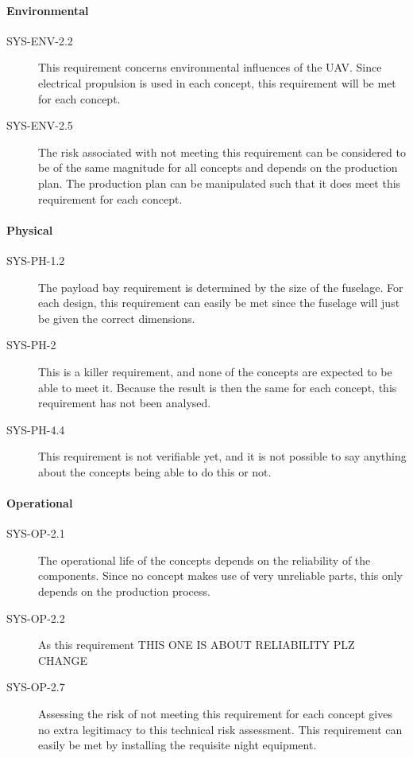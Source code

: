 \paragraph{Environmental}

\begin{description}
    \item[SYS-ENV-2.2] This requirement concerns environmental influences of the UAV. Since electrical propulsion is used in each concept, this requirement will be met for each concept.
    \item[SYS-ENV-2.5] The risk associated with not meeting this requirement can be considered to be of the same magnitude for all concepts and depends on the production plan. The production plan can be manipulated such that it does meet this requirement for each concept.
\end{description}


\paragraph{Physical}

\begin{description}
    \item[SYS-PH-1.2] The payload bay requirement is determined by the size of the fuselage. For each design, this requirement can easily be met since the fuselage will just be given the correct dimensions.
    \item[SYS-PH-2] This is a killer requirement, and none of the concepts are expected to be able to meet it. Because the result is then the same for each concept, this requirement has not been analysed.
    \item[SYS-PH-4.4] This requirement is not verifiable yet, and it is not possible to say anything about the concepts being able to do this or not. 
\end{description}


\paragraph{Operational}

\begin{description}
    \item[SYS-OP-2.1] The operational life of the concepts depends on the reliability of the components. Since no concept makes use of very unreliable parts, this only depends on the production process.
    \item[SYS-OP-2.2] As this requirement THIS ONE IS ABOUT RELIABILITY PLZ CHANGE
    \item[SYS-OP-2.7] Assessing the risk of not meeting this requirement for each concept gives no extra legitimacy to this technical risk assessment. This requirement can easily be met by installing the requisite night equipment.
\end{description}



